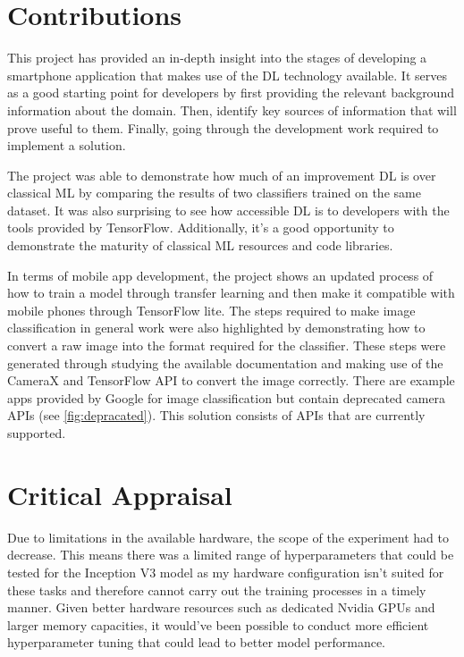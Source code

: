 \documentclass[12pt,a4paper]{report}
\begin{document}
\section{Contributions}

This project has provided an in-depth insight into the stages of developing a smartphone application that makes use of 
the DL technology available. It serves as a good starting point for developers by first providing the 
relevant background information about the domain. Then, identify key sources of information that will prove useful to
them. Finally, going through the development work required to implement a solution.

\par

The project was able to demonstrate how much of an improvement DL is over classical ML by 
comparing the results of two classifiers trained on the same dataset. It was also surprising to see how accessible DL 
is to developers with the tools provided by TensorFlow. Additionally, it's a good opportunity to demonstrate 
the maturity of classical ML resources and code libraries.

\par

In terms of mobile app development, the project shows an updated process of how to train a model through transfer 
learning and then make it compatible with mobile phones through TensorFlow lite. The steps required to make image 
classification in general work were also highlighted by demonstrating how to convert a raw image into the format 
required for the classifier. These steps were generated through studying the available documentation and making use of 
the CameraX and TensorFlow API to convert the image correctly. There are example apps provided by Google for image 
classification but contain deprecated camera APIs (see \ref{fig:depracated}). This solution consists of APIs that are 
currently supported.

\section{Critical Appraisal}

Due to limitations in the available hardware, the scope of the experiment had to decrease. This means there was a limited
range of hyperparameters that could be tested for the Inception V3 model as my hardware configuration isn't suited for 
these tasks and therefore cannot carry out the training processes in a timely manner. Given better hardware resources 
such as dedicated Nvidia GPUs and larger memory capacities, it would've been possible to conduct more efficient 
hyperparameter tuning that could lead to better model performance. 
\end{document}
